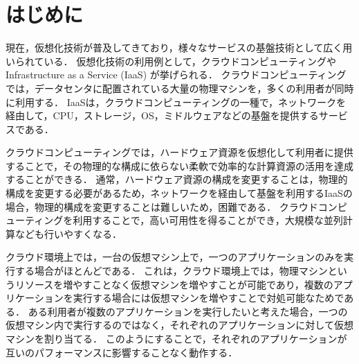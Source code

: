 \documentclass[graduation-thesis]{mlarticle}
\author{61200185 情報工学科 縣直道}
\date{\today}
\title{}
\begin{document}
\makeatletter
\renewcommand{\thetable}{
        \thesection.\arabic{table}
} %
  
\renewcommand{\thefigure}{
        \thesection.\arabic{figure}
}

\setcounter{page}{1}

\tableofcontents
\clearpage


 

\section{はじめに}
\label{intro}
現在，仮想化技術が普及してきており，様々なサービスの基盤技術として広く用いられている．
仮想化技術の利用例として，クラウドコンピューティングやInfrastructure as a Service (IaaS) が挙げられる．
クラウドコンピューティングでは，データセンタに配置されている大量の物理マシンを，多くの利用者が同時に利用する．
IaaSは，クラウドコンピューティングの一種で，ネットワークを経由して，CPU，ストレージ，OS，ミドルウェアなどの基盤を提供するサービスである．

クラウドコンピューティングでは，ハードウェア資源を仮想化して利用者に提供することで，その物理的な構成に依らない柔軟で効率的な計算資源の活用を達成することができる．
通常，ハードウェア資源の構成を変更することは，物理的構成を変更する必要があるため，ネットワークを経由して基盤を利用するIaaSの場合，物理的構成を変更することは難しいため，困難である．
クラウドコンピューティングを利用することで，高い可用性を得ることができ，大規模な並列計算なども行いやすくなる．

クラウド環境上では，一台の仮想マシン上で，一つのアプリケーションのみを実行する場合がほとんどである．
これは，クラウド環境上では，物理マシンというリソースを増やすことなく仮想マシンを増やすことが可能であり，複数のアプリケーションを実行する場合には仮想マシンを増やすことで対処可能なためである．
ある利用者が複数のアプリケーションを実行したいと考えた場合，一つの仮想マシン内で実行するのではなく，それぞれのアプリケーションに対して仮想マシンを割り当てる．
このようにすることで，それぞれのアプリケーションが互いのパフォーマンスに影響することなく動作する．
\end{document}
